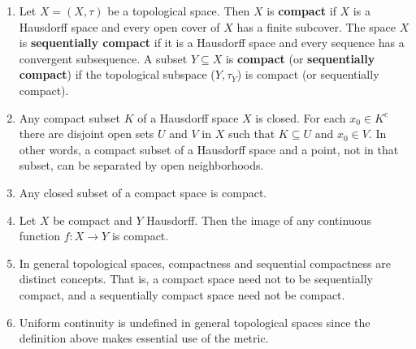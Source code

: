 \begin{remark}
    \begin{enumerate}[label=(\alph*)]
        \item Let \(X = \left(X, \tau\right)\) be a topological space. Then \(X\) is 
    \textbf{compact} if \(X\) is a Hausdorff space and every open cover of \(X\) has a finite
    subcover. The space \(X\) is \textbf{sequentially compact} if it is a Hausdorff space 
    and every sequence has a convergent subsequence. A subset \(Y \subseteq X\) is \textbf{compact}
    (or \textbf{sequentially compact}) if the topological subspace (\(Y, \tau_Y\)) is compact
    (or sequentially compact). 
        
        \item Any compact subset \(K\) of a Hausdorff space \(X\) is closed. For each \(x_0 \in K^c\)
        there are disjoint open sets \(U\) and \(V\) in \(X\) such that \(K \subseteq U\) and 
        \(x_0 \in V\). In other words, a compact subset of a Hausdorff space and a point, not 
        in that subset, can be separated by open neighborhoods. 
        
        \item Any closed subset of a compact space is compact. 
        \item Let \(X\) be compact and \(Y\) Hausdorff. Then the image of any continuous 
        function \(f \colon X \to Y\) is compact. 
        \item In general topological spaces, compactness and sequential compactness are 
        distinct concepts. That is, a compact space need not to be sequentially compact, and 
        a sequentially compact space need not be compact. 
        \item Uniform continuity is undefined in general topological spaces since the definition 
        above makes essential use of the metric.  
    \end{enumerate}
\end{remark}


